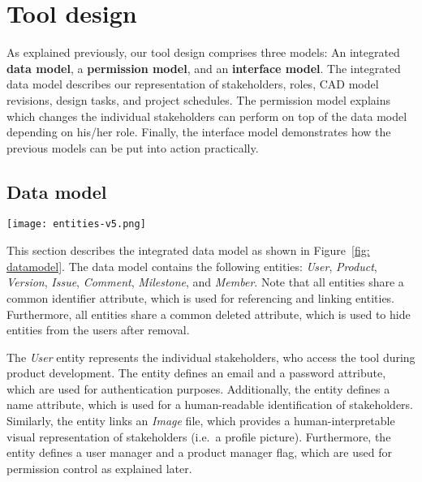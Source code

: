 \section{Tool design}
    \label{sec:contribution}

    As explained previously, our tool design comprises three models: An integrated \textbf{data model}, a \textbf{permission model}, and an \textbf{interface model}.
    The integrated data model describes our representation of stakeholders, roles, CAD model revisions, design tasks, and project schedules.
    The permission model explains which changes the individual stakeholders can perform on top of the data model depending on his/her role.
    Finally, the interface model demonstrates how the previous models can be put into action practically.

    \subsection*{Data model}

    \begin{figure*}[ht]
        \centering
        \texttt{[image: entities-v5.png]}
        \caption{Integrated data model for improved information exchange between customers, project managers, requirements engineers, and product designers}
        \label{fig: datamodel}
    \end{figure*}

    This section describes the integrated data model as shown in Figure~\ref{fig: datamodel}.
    The data model contains the following entities: \textit{User}, \textit{Product}, \textit{Version}, \textit{Issue}, \textit{Comment}, \textit{Milestone}, and \textit{Member}.
    Note that all entities share a common identifier attribute, which is used for referencing and linking entities.
    Furthermore, all entities share a common deleted attribute, which is used to hide entities from the users after removal.

    The \textit{User} entity represents the individual stakeholders, who access the tool during product development.
    The entity defines an email and a password attribute, which are used for authentication purposes.
    Additionally, the entity defines a name attribute, which is used for a human-readable identification of stakeholders.
    Similarly, the entity links an \textit{Image} file, which provides a human-interpretable visual representation of stakeholders (i.e.\ a profile picture).
    Furthermore, the entity defines a user manager and a product manager flag, which are used for permission control as explained later.
    
